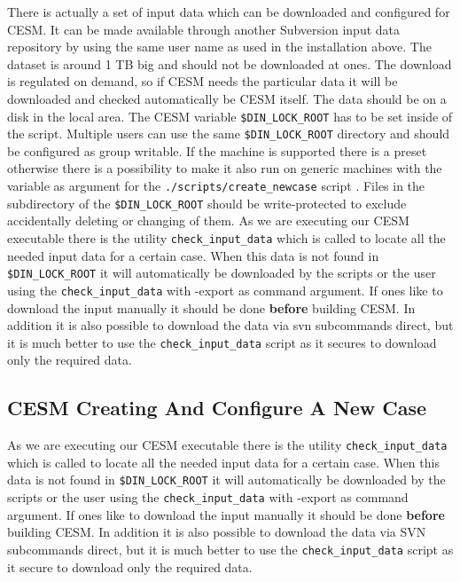 \documentclass[]{article}
\begin{document}
There is actually a set of input data which can be downloaded and
configured for CESM. It can be made available through another Subversion
input data repository by using the same user name as used in the
installation above. The dataset is around 1 TB big and should not be
downloaded at ones. The download is regulated on demand, so if CESM
needs the particular data it will be downloaded and checked
automatically be CESM itself. The data should be on a disk in the local
area. The CESM variable \texttt{\$DIN\_LOCK\_ROOT} has to be set inside
of the script. Multiple users can use the same
\texttt{\$DIN\_LOCK\_ROOT} directory and should be configured as group
writable. If the machine is supported there is a preset otherwise there
is a possibility to make it also run on generic machines with the
variable as argument for the \texttt{./scripts/create\_newcase} script .
Files in the subdirectory of the \texttt{\$DIN\_LOCK\_ROOT} should be
write-protected to exclude accidentally deleting or changing of them. As
we are executing our CESM executable there is the utility
\texttt{check\_input\_data} which is called to locate all the needed
input data for a certain case. When this data is not found in
\texttt{\$DIN\_LOCK\_ROOT} it will automatically be downloaded by the
scripts or the user using the \texttt{check\_input\_data} with -export
as command argument. If ones like to download the input manually it
should be done \textbf{before} building CESM. In addition it is also
possible to download the data via svn subcommands direct, but it is much
better to use the \texttt{check\_input\_data} script as it secures to
download only the required data.

\subsection{CESM Creating And Configure A New
Case}\label{cesm-creating-and-configure-a-new-case}

As we are executing our CESM executable there is the utility
\texttt{check\_input\_data} which is called to locate all the needed
input data for a certain case. When this data is not found in
\texttt{\$DIN\_LOCK\_ROOT} it will automatically be downloaded by the
scripts or the user using the \texttt{check\_input\_data} with -export
as command argument. If ones like to download the input manually it
should be done \textbf{before} building CESM. In addition it is also
possible to download the data via SVN subcommands direct, but it is much
better to use the \texttt{check\_input\_data} script as it secure to
download only the required data.
\end{document}

